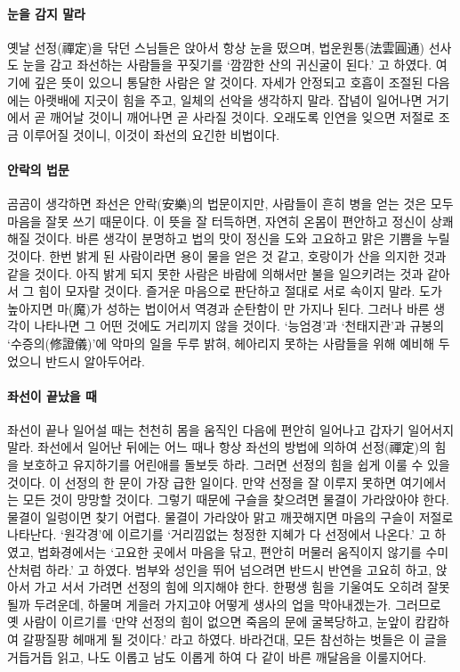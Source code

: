 \documentclass[12pt, a4paper, oneside]{book}
\begin{document}
\paragraph{눈을 감지 말라}
옛날 선정(禪定)을 닦던 스님들은 앉아서 항상 눈을 떴으며, 법운원통(法雲圓通) 선사도 눈을 감고 좌선하는 사람들을 꾸짖기를 ‘깜깜한 산의 귀신굴이 된다.’ 고 하였다. 여기에 깊은 뜻이 있으니 통달한 사람은 알 것이다.
자세가 안정되고 호흡이 조절된 다음에는 아랫배에 지긋이 힘을 주고, 일체의 선악을 생각하지 말라. 잡념이 일어나면 거기에서 곧 깨어날 것이니 깨어나면 곧 사라질 것이다. 오래도록 인연을 잊으면 저절로 조금 이루어질 것이니, 이것이 좌선의 요긴한 비법이다.

\paragraph{안락의 법문}
곰곰이 생각하면 좌선은 안락(安樂)의 법문이지만, 사람들이 흔히 병을 얻는 것은 모두 마음을 잘못 쓰기 때문이다. 이 뜻을 잘 터득하면, 자연히 온몸이 편안하고 정신이 상쾌해질 것이다. 바른 생각이 분명하고 법의 맛이 정신을 도와 고요하고 맑은 기쁨을 누릴 것이다. 한번 밝게 된 사람이라면 용이 물을 얻은 것 같고, 호랑이가 산을 의지한 것과 같을 것이다. 아직 밝게 되지 못한 사람은 바람에 의해서만 불을 일으키려는 것과 같아서 그 힘이 모자랄 것이다. 즐거운 마음으로 판단하고 절대로 서로 속이지 말라.
도가 높아지면 마(魔)가 성하는 법이어서 역경과 순탄함이 만 가지나 된다. 그러나 바른 생각이 나타나면 그 어떤 것에도 거리끼지 않을 것이다.
‘능엄경’과 ‘천태지관’과 규봉의 ‘수증의(修證儀)’에 악마의 일을 두루 밝혀, 헤아리지 못하는 사람들을 위해 예비해 두었으니 반드시 알아두어라.

\paragraph{좌선이 끝났을 때}
좌선이 끝나 일어설 때는 천천히 몸을 움직인 다음에 편안히 일어나고 갑자기 일어서지 말라. 좌선에서 일어난 뒤에는 어느 때나 항상 좌선의 방법에 의하여 선정(禪定)의 힘을 보호하고 유지하기를 어린애를 돌보듯 하라. 그러면 선정의 힘을 쉽게 이룰 수 있을 것이다.
이 선정의 한 문이 가장 급한 일이다. 만약 선정을 잘 이루지 못하면 여기에서는 모든 것이 망망할 것이다. 그렇기 때문에 구슬을 찾으려면 물결이 가라앉아야 한다. 물결이 일렁이면 찾기 어렵다. 물결이 가라앉아 맑고 깨끗해지면 마음의 구슬이 저절로 나타난다.
‘원각경’에 이르기를 ‘거리낌없는 청정한 지혜가 다 선정에서 나온다.’ 고 하였고, 법화경에서는 ‘고요한 곳에서 마음을 닦고, 편안히 머물러 움직이지 않기를 수미산처럼 하라.’ 고 하였다.
범부와 성인을 뛰어 넘으려면 반드시 반연을 고요히 하고, 앉아서 가고 서서 가려면 선정의 힘에 의지해야 한다. 한평생 힘을 기울여도 오히려 잘못될까 두려운데, 하물며 게을러 가지고야 어떻게 생사의 업을 막아내겠는가.
그러므로 옛 사람이 이르기를 ‘만약 선정의 힘이 없으면 죽음의 문에 굴복당하고, 눈앞이 캄캄하여 갈팡질팡 헤매게 될 것이다.’ 라고 하였다. 바라건대, 모든 참선하는 벗들은 이 글을 거듭거듭 읽고, 나도 이롭고 남도 이롭게 하여 다 같이 바른 깨달음을 이룰지어다. 
\end{document}

